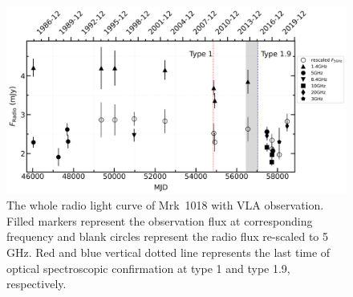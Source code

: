 \documentclass[twocolumn]{aastex63}
\begin{document}
\begin{figure}
\centering
	\includegraphics[width=\textwidth]{./pic/subplots-radio-second_freq.png}
    \caption{The whole radio light curve of Mrk~1018 with VLA observation. Filled markers represent the observation flux at corresponding frequency and blank circles represent the radio flux re-scaled to 5 GHz. Red and blue vertical dotted line represents the last time of optical spectroscopic confirmation at type 1 and type 1.9, respectively.}
    \label{fig:radio-lc}
\end{figure}
\end{document}
